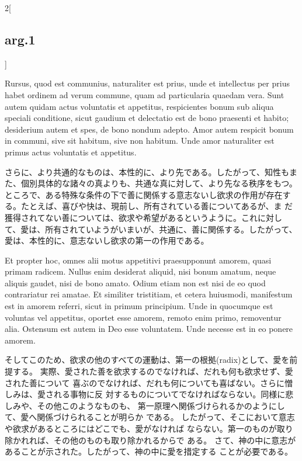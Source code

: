 \documentclass[paper=a4paper,fontsize=10pt,jafontsize=9pt,titlepage]{jlreq}
\begin{document}
\begin{paracol}{2}[\subsection{arg.1}]
\switchcolumn*


Rursus, quod est communius, naturaliter est prius, unde et
intellectus per prius habet ordinem ad verum commune, quam ad
particularia quaedam vera. Sunt autem quidam actus voluntatis et
appetitus, respicientes bonum sub aliqua speciali conditione, sicut
gaudium et delectatio est de bono praesenti et habito; desiderium autem
et spes, de bono nondum adepto. Amor autem respicit bonum in communi,
sive sit habitum, sive non habitum. Unde amor naturaliter est primus
actus voluntatis et appetitus.

\switchcolumn

さらに、より共通的なものは、本性的に、より先である。したがって、知性もま
 た、個別具体的な諸々の真よりも、共通な真に対して、より先なる秩序をもつ。
 ところで、ある特殊な条件の下で善に関係する意志ないし欲求の作用が存在す
 る。たとえば、喜びや快は、現前し、所有されている善についてあるが、ま
 だ獲得されてない善については、欲求や希望があるというように。これに対し
 て、愛は、所有されていようがいまいが、共通に、善に関係する。したがって、
 愛は、本性的に、意志ないし欲求の第一の作用である。

\switchcolumn*


Et propter hoc, omnes alii motus
appetitivi praesupponunt amorem, quasi primam radicem. Nullus enim
desiderat aliquid, nisi bonum amatum, neque aliquis gaudet, nisi de bono
amato. Odium etiam non est nisi de eo quod contrariatur rei amatae. Et
similiter tristitiam, et cetera huiusmodi, manifestum est in amorem
referri, sicut in primum principium. Unde in quocumque est voluntas vel
appetitus, oportet esse amorem, remoto enim primo, removentur
alia. Ostensum est autem in Deo esse voluntatem. Unde necesse est in eo
ponere amorem.

\switchcolumn

そしてこのため、欲求の他のすべての運動は、第一の根拠(radix)として、愛を前提する。
実際、愛された善を欲求するのでなければ、だれも何も欲求せず、愛された善について
喜ぶのでなければ、だれも何についても喜ばない。さらに憎しみは、愛される事物に反
 対するものについてでなければならない。同様に悲しみや、その他このようなものも、
 第一原理へ関係づけられるかのようにして、愛へ関係づけられることが明らか
 である。
したがって、そこにおいて意志や欲求があるところにはどこでも、愛がなければ
 ならない。第一のものが取り除かれれば、その他のものも取り除かれるからで
 ある。
さて、神の中に意志があることが示された。したがって、神の中に愛を措定する
 ことが必要である。

\switchcolumn*[\subsection{ad.1}]



\end{paracol}
\end{document}
